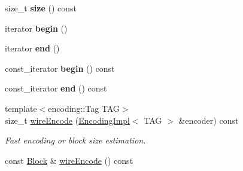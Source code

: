 \begin{DoxyCompactItemize}
\item 
size\+\_\+t {\bfseries size} () const\hypertarget{classndn_1_1security_1_1AdditionalDescription_a20c962b45886de71f764720106617c9d}{}\label{classndn_1_1security_1_1AdditionalDescription_a20c962b45886de71f764720106617c9d}

\item 
iterator {\bfseries begin} ()\hypertarget{classndn_1_1security_1_1AdditionalDescription_a35a23ca4593f1dead774cab6e93af662}{}\label{classndn_1_1security_1_1AdditionalDescription_a35a23ca4593f1dead774cab6e93af662}

\item 
iterator {\bfseries end} ()\hypertarget{classndn_1_1security_1_1AdditionalDescription_a494e35d1f699a6a4d23d4883ec869b67}{}\label{classndn_1_1security_1_1AdditionalDescription_a494e35d1f699a6a4d23d4883ec869b67}

\item 
const\+\_\+iterator {\bfseries begin} () const\hypertarget{classndn_1_1security_1_1AdditionalDescription_a5083b3809abd559ba7a939dd10e4d16c}{}\label{classndn_1_1security_1_1AdditionalDescription_a5083b3809abd559ba7a939dd10e4d16c}

\item 
const\+\_\+iterator {\bfseries end} () const\hypertarget{classndn_1_1security_1_1AdditionalDescription_a847ad6656a9e7001b7aa25e34182f23f}{}\label{classndn_1_1security_1_1AdditionalDescription_a847ad6656a9e7001b7aa25e34182f23f}

\item 
{\footnotesize template$<$encoding\+::\+Tag T\+AG$>$ }\\size\+\_\+t \hyperlink{classndn_1_1security_1_1AdditionalDescription_a319b32388434896e5b7ca7c161ca410f}{wire\+Encode} (\hyperlink{classndn_1_1encoding_1_1EncodingImpl}{Encoding\+Impl}$<$ T\+AG $>$ \&encoder) const\hypertarget{classndn_1_1security_1_1AdditionalDescription_a319b32388434896e5b7ca7c161ca410f}{}\label{classndn_1_1security_1_1AdditionalDescription_a319b32388434896e5b7ca7c161ca410f}

\begin{DoxyCompactList}\small\item\em Fast encoding or block size estimation. \end{DoxyCompactList}\item 
const \hyperlink{classndn_1_1Block}{Block} \& \hyperlink{classndn_1_1security_1_1AdditionalDescription_a8cb6220b45009d76c982a3c76a359e21}{wire\+Encode} () const\hypertarget{classndn_1_1security_1_1AdditionalDescription_a8cb6220b45009d76c982a3c76a359e21}{}\label{classndn_1_1security_1_1AdditionalDescription_a8cb6220b45009d76c982a3c76a359e21}


\end{DoxyCompactItemize}
